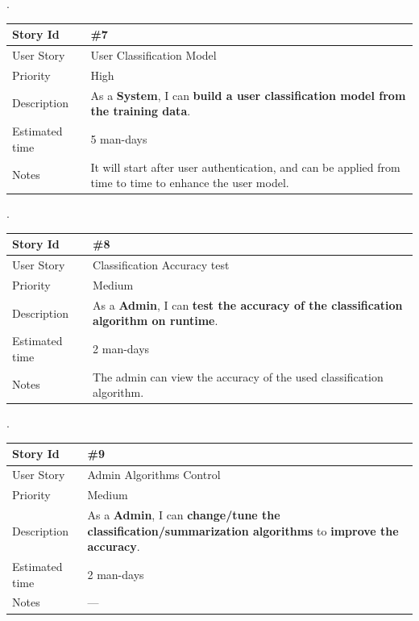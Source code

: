 \documentclass[a4paper,10pt]{article}
\begin{document}
.\\

\begin{tabular}{|p{3cm}|p{10cm}|}
\hline
\cellcolor[gray]{0.9} Story Id & \#7 \\ \hline
\cellcolor[gray]{0.9} User Story & User Classification Model \\ \hline
\cellcolor[gray]{0.9} Priority & High\\ \hline
\cellcolor[gray]{0.9} Description & 
	As a \textbf{System}, I can \textbf{build a user classification 
	model from the training data}. \\ \hline
\cellcolor[gray]{0.9} Estimated time & 5 man-days\\ \hline
\cellcolor[gray]{0.9} Notes & 
	It will start after user authentication, and can be applied 
	from time to time to enhance the user model. \\ \hline
\end{tabular}

.\\

\begin{tabular}{|p{3cm}|p{10cm}|}
\hline
\cellcolor[gray]{0.9} Story Id & \#8 \\ \hline
\cellcolor[gray]{0.9} User Story & Classification Accuracy test \\ \hline
\cellcolor[gray]{0.9} Priority & Medium \\ \hline
\cellcolor[gray]{0.9} Description & 
	As a \textbf{Admin}, I can \textbf{test the accuracy of the 
	classification algorithm on runtime}. \\ \hline
\cellcolor[gray]{0.9} Estimated time & 2 man-days\\ \hline
\cellcolor[gray]{0.9} Notes & 
	The admin can view the accuracy of the used classification algorithm. \\ \hline
\end{tabular}

.\\

\begin{tabular}{|p{3cm}|p{10cm}|}
\hline
\cellcolor[gray]{0.9} Story Id & \#9 \\ \hline
\cellcolor[gray]{0.9} User Story & Admin Algorithms Control \\ \hline
\cellcolor[gray]{0.9} Priority & Medium \\ \hline
\cellcolor[gray]{0.9} Description & 
	As a \textbf{Admin}, I can \textbf{change/tune the 
	classification/summarization algorithms} to
	\textbf{improve the accuracy}. \\ \hline
\cellcolor[gray]{0.9} Estimated time & 2 man-days\\ \hline
\cellcolor[gray]{0.9} Notes & --- \\ \hline
\end{tabular}
\end{document}
